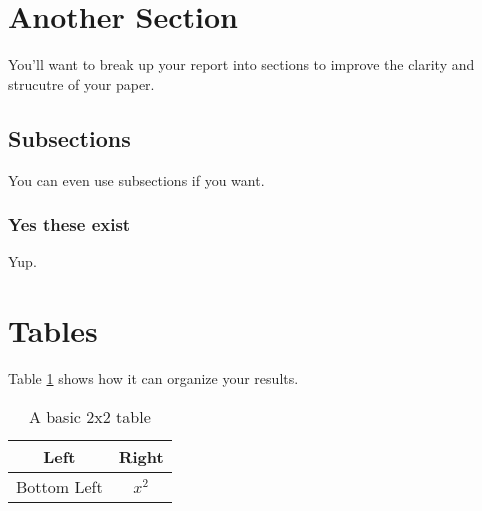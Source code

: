 \documentclass{article}
\begin{document}
\section{Another Section}
You'll want to break up your report into sections to improve the clarity and strucutre of your paper.
\subsection{Subsections}
You can even use subsections if you want.
\subsubsection{Yes these exist}
Yup.

\section{Tables}
Table \ref{tab:example} shows how it can organize your results.
\begin{table}[!h]
\center
\begin{tabular}{|c|c|}
\hline
Left & Right \\
\hline
Bottom Left & $x^2$ \\
\hline
\end{tabular}
\caption{A basic 2x2 table} %
\label{tab:example}
\end{table}
\end{document}
